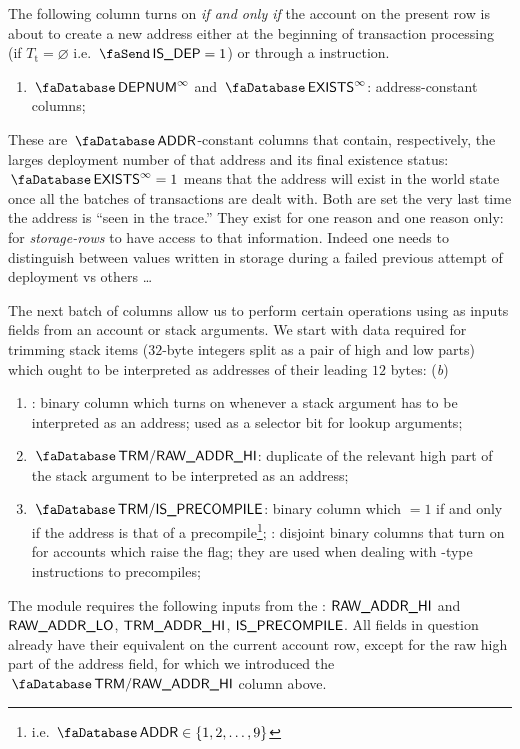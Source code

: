 The following column turns on \emph{if and only if} the account on the present row is about to create a new address either at the beginning of transaction processing (if $T_\text{t} = \varnothing$ i.e. $\txIsDeployment = 1$) or through a  instruction. 
\begin{enumerate}[resume]
	\item {}$\accDeploymentNumber^\infty$ and $\accExists^\infty$:
		address-constant columns;
\end{enumerate}
These are $\accAddress$-constant columns that contain, respectively, the larges deployment number of that address and its final existence status: $\accExists^\infty = 1$ means that the address will exist in the world state once all the batches of transactions are dealt with. Both are set the very last time the address is ``seen in the trace.'' They exist for one reason and one reason only: for \emph{storage-rows} to have access to that information. Indeed one needs to distinguish between values written in storage during a failed previous attempt of deployment vs others \dots{}  

The next batch of columns allow us to perform certain operations using as inputs fields from an account or stack arguments. We start with data required for trimming stack items ($32$-byte integers split as a pair of high and low parts) which ought to be interpreted as addresses of their leading $12$ bytes:
(\emph{b})
\begin{enumerate}[resume]
	\item \accTrmFlag: binary column which turns on whenever a stack argument has to be interpreted as an address; used as a selector bit for lookup arguments;
	\item $\accTrmRawAddrHi$: duplicate of the relevant high part of the stack argument to be interpreted as an address;
	\item $\accTrmIsPrecompile$:
		binary column which $=1$ if and only if the address is that of a precompile\footnote{i.e. $\accAddress \in \{1, 2, \dots, 9 \}$};
		: disjoint binary columns that turn on for accounts which raise the \accTrmIsPrecompile{} flag; they are used when dealing with -type instructions to precompiles;
\end{enumerate}
\saNote{} The \trmMod{} module requires the following inputs from the \hubMod{}:
$\textsf{RAW\_ADDR\_HI}$ and $\textsf{RAW\_ADDR\_LO}$,
$\textsf{TRM}\textsf{\_}\textsf{ADDR}\textsf{\_HI}$,
$\textsf{IS\_PRECOMPILE}$.
All fields in question already have their equivalent on the current account row, except for the raw high part of the address field, for which we introduced the $\accTrmRawAddrHi$ column above.

